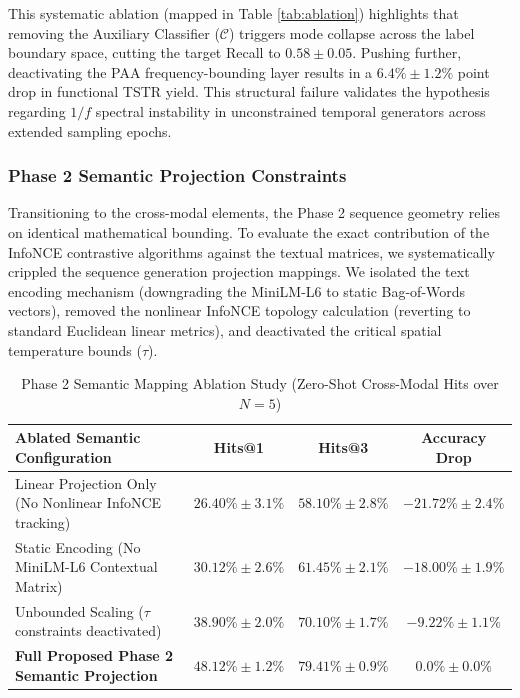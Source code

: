 \documentclass[journal]{IEEEtran}
\begin{document}
This systematic ablation (mapped in Table \ref{tab:ablation}) highlights that removing the Auxiliary Classifier ($\mathcal{C}$) triggers mode collapse across the label boundary space, cutting the target Recall to $0.58 \pm 0.05$. Pushing further, deactivating the PAA frequency-bounding layer results in a $6.4\% \pm 1.2\%$ point drop in functional TSTR yield. This structural failure validates the hypothesis regarding $1/f$ spectral instability in unconstrained temporal generators across extended sampling epochs.

\subsubsection{Phase 2 Semantic Projection Constraints}
Transitioning to the cross-modal elements, the Phase 2 sequence geometry relies on identical mathematical bounding. To evaluate the exact contribution of the InfoNCE contrastive algorithms against the textual matrices, we systematically crippled the sequence generation projection mappings. We isolated the text encoding mechanism (downgrading the MiniLM-L6 to static Bag-of-Words vectors), removed the nonlinear InfoNCE topology calculation (reverting to standard Euclidean linear metrics), and deactivated the critical spatial temperature bounds ($\tau$).

\begin{table}[t]
\centering
\caption{Phase 2 Semantic Mapping Ablation Study (Zero-Shot Cross-Modal Hits over $N=5$)}
\label{tab:semantic_ablation}
\begin{tabular}{lccc}
\toprule
\textbf{Ablated Semantic Configuration} & \textbf{Hits@1} & \textbf{Hits@3} & \textbf{Accuracy Drop} \\
\midrule
Linear Projection Only (No Nonlinear InfoNCE tracking) & $26.40\% \pm 3.1\%$ & $58.10\% \pm 2.8\%$ & $-21.72\% \pm 2.4\%$ \\
Static Encoding (No MiniLM-L6 Contextual Matrix) & $30.12\% \pm 2.6\%$ & $61.45\% \pm 2.1\%$ & $-18.00\% \pm 1.9\%$ \\
Unbounded Scaling ($\tau$ constraints deactivated) & $38.90\% \pm 2.0\%$ & $70.10\% \pm 1.7\%$ & $-9.22\% \pm 1.1\%$ \\
\textbf{Full Proposed Phase 2 Semantic Projection} & \textbf{$48.12\% \pm 1.2\%$} & \textbf{$79.41\% \pm 0.9\%$} & \textbf{$0.0\% \pm 0.0\%$} \\
\bottomrule
\end{tabular}
\end{table}
\end{document}
